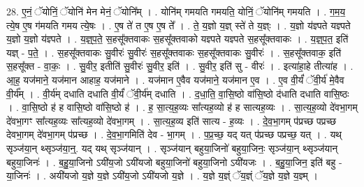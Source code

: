 \documentclass[17pt]{extarticle}
\begin{document}
28. ए॒नं॒ ॅयोनिं॒ ॅयोनि॑ मेन मेनं॒ ॅयोनि᳚म् । . योनि॑म् गमयति गमयति॒ योनिं॒ ॅयोनि॑म् गमयति । . ग॒म॒य॒ त्ये॒ष ए॒ष ग॑मयति गमय त्ये॒षः । . ए॒ष ते॑ त ए॒ष ए॒ष ते᳚ । . ते॒ य॒ज्ञो य॒ज्ञ् स्ते॑ ते य॒ज्ञ्ः । . य॒ज्ञो य॑ज्ञ्पते यज्ञ्पते य॒ज्ञो य॒ज्ञो य॑ज्ञ्पते । . य॒ज्ञ्॒प॒ते॒ स॒हसू᳚क्तवाकः स॒हसू᳚क्तवाको यज्ञ्पते यज्ञ्पते स॒हसू᳚क्तवाकः । . य॒ज्ञ्॒प॒त॒ इति॑ यज्ञ् - प॒ते॒ । . स॒हसू᳚क्तवाकः सु॒वीरः॑ सु॒वीरः॑ स॒हसू᳚क्तवाकः स॒हसू᳚क्तवाकः सु॒वीरः॑ । . स॒हसू᳚क्तवाक॒ इति॑ स॒हसू᳚क्त - वा॒कः॒ । . सु॒वीर॒ इतीति॑ सु॒वीरः॑ सु॒वीर॒ इति॑ । . सु॒वीर॒ इति॑ सु - वीरः॑ । . इत्या॑हा॒हे तीत्या॑ह । . आ॒ह॒ यज॑माने॒ यज॑मान आहाह॒ यज॑माने । . यज॑मान ए॒वैव यज॑माने॒ यज॑मान ए॒व । . ए॒व वी॒र्यं॑ ॅवी॒र्य॑ मे॒वैव वी॒र्य᳚म् । . वी॒र्य॑म् दधाति दधाति वी॒र्यं॑ ॅवी॒र्य॑म् दधाति । . द॒धा॒ति॒ वा॒सि॒ष्ठो वा॑सि॒ष्ठो द॑धाति दधाति वासि॒ष्ठः । . वा॒सि॒ष्ठो ह॑ ह वासि॒ष्ठो वा॑सि॒ष्ठो ह॑ । . ह॒ सा॒त्य॒ह॒व्यः सा᳚त्यह॒व्यो ह॑ ह सात्यह॒व्यः । . सा॒त्य॒ह॒व्यो दे॑वभा॒गम् दे॑वभा॒गꣳ सा᳚त्यह॒व्यः सा᳚त्यह॒व्यो दे॑वभा॒गम् । . सा॒त्य॒ह॒व्य इति॑ सात्य - ह॒व्यः । . दे॒व॒भा॒गम् प॑प्रच्छ पप्रच्छ देवभा॒गम् दे॑वभा॒गम् प॑प्रच्छ । . दे॒व॒भा॒गमिति॑ देव - भा॒गम् । . प॒प्र॒च्छ॒ यद् यत् प॑प्रच्छ पप्रच्छ॒ यत् । . यथ् सृञ्ज॑या॒न् थ्सृञ्ज॑या॒न्॒. यद् यथ् सृञ्ज॑यान् । . सृञ्ज॑यान् बहुया॒जिनो॑ बहुया॒जिनः॒ सृञ्ज॑या॒न् थ्सृञ्ज॑यान् बहुया॒जिनः॑ । . ब॒हु॒या॒जिनो ऽयी॑य॒जो ऽयी॑यजो बहुया॒जिनो॑ बहुया॒जिनो ऽयी॑यजः । . ब॒हु॒या॒जिन॒ इति॑ बहु - या॒जिनः॑ । . अयी॑यजो य॒ज्ञे य॒ज्ञे ऽयी॑य॒जो ऽयी॑यजो य॒ज्ञे । . य॒ज्ञे य॒ज्ञ्ं ॅय॒ज्ञ्ं ॅय॒ज्ञे य॒ज्ञे य॒ज्ञ्म् । \newline
\end{document}

